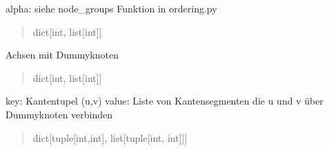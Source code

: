 \documentclass[a4paper,10pt,ngerman]{sphinxmanual}
\begin{document}
\begin{fulllineitems}

\begin{fulllineitems}
\label{\detokenize{api:src.hiveplot.HivePlotLayout.node_groups}}
\pysigstartsignatures
\pysigline
{}
\pysigstopsignatures
\sphinxAtStartPar
alpha: siehe node\_groups Funktion in ordering.py
\begin{quote}\begin{description}
\sphinxAtStartPar
dict{[}int, list{[}int{]}{]}

\end{description}\end{quote}

\end{fulllineitems}


\begin{fulllineitems}
\label{\detokenize{api:src.hiveplot.HivePlotLayout.node_groups_dummies}}
\pysigstartsignatures
\pysigline
{}
\pysigstopsignatures
\sphinxAtStartPar
Achsen mit Dummyknoten
\begin{quote}\begin{description}
\sphinxAtStartPar
dict{[}int, list{[}int{]}{]}

\end{description}\end{quote}

\end{fulllineitems}



\begin{fulllineitems}

\pysigstartsignatures
\pysigline
{}
\pysigstopsignatures
\sphinxAtStartPar
key: Kantentupel (u,v) value: Liste von Kantensegmenten die u und v über Dummyknoten verbinden
\begin{quote}\begin{description}
\sphinxAtStartPar
dict{[}tuple{[}int,int{]}, list{[}tuple{[}int, int{]}{]}{]}

\end{description}\end{quote}


\end{fulllineitems}
\end{fulllineitems}
\end{document}
